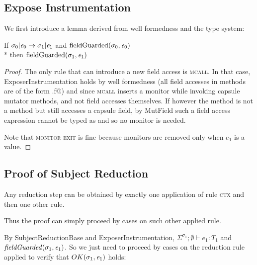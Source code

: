 \subsection{Expose Instrumentation}
We first introduce a lemma derived from well formedness and the type system:
\begin{Lemma}[ExposerInstrumentation]
If $\sigma_0 | \e_0\rightarrow \sigma_1 |\e_1$ and
$\text{fieldGuarded}(\sigma_0,\e_0)$
\\*
then $\text{fieldGuarded}(\sigma_1,\e_1)$
\end{Lemma}
\begin{proof}
The only rule that can 
introduce a new field access is \textsc{mcall}.
In that case, ExposerInstrumentation holds
by well formedness (all field accesses in methods are of the form \Q@this.f@) 
and since \textsc{mcall} inserts a monitor while invoking capsule mutator methods, and not field accesses themselves. If however the method is not a \Q@mut@ method but still accesses a capsule field, by MutField such a field access expression cannot be typed as \Q@mut@ and so no monitor is needed.

Note that \textsc{monitor exit} is fine because monitors are removed only when
 $e_1$ is a value.
\end{proof}

\subsection{Proof of Subject Reduction}
Any reduction step can be obtained
by exactly one application of rule \textsc{ctx} and then one other rule.



Thus the proof can simply proceed by cases on such other applied rule.

By SubjectReductionBase and ExposerInstrumentation, 
$\Sigma^{\sigma_1};\emptyset\vdash e_1: T_1$ and  $\mathit{fieldGuarded}(\sigma_1,\e_1)$. So we just need to proceed by cases on the reduction rule applied to verify that $OK(\sigma_1,\e_1)$ holds:


